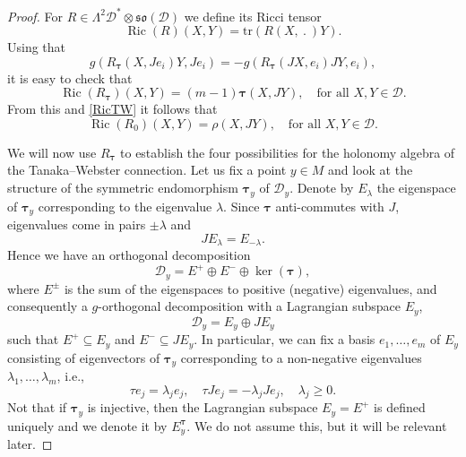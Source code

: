 \documentclass{amsart}
\theoremstyle{plain}
\theoremstyle{definition}
\newcommand{\Ric}{\operatorname{Ric}}
\def\so{\mathfrak{so}}
\newcommand{\bt}{{\boldsymbol{\tau}}}
\newcommand{\1}{\mathbf{1}}
\newcommand{\D}{{\mathcal D}}
\newcommand{\+}{\oplus}
\newcommand{\tcom}[1]{
 \marginpar{{\scriptsize  T: #1 }}}
\begin{document}
\begin{proof}
For $R\in \Lambda^2\D^*\otimes \so(\D)$ we define its Ricci tensor
\[\Ric(R)(X,Y)=\mathrm{tr}(R(X,\ .\ )Y).\]
Using that 
\[ g(R_\bt(X,Je_i)Y,Je_i) = -g(R_\bt(JX,e_i)JY,e_i),\]
it is easy to check that
\[
\Ric(R_\bt)(X,Y)=
(m-1)\bt(X,JY),\quad \text{for all } X,Y\in\D.\]
From this and \eqref{RicTW}  it follows that
\begin{equation}
\label{RicR0}\Ric(R_0)(X,Y)=\rho(X,JY),\quad\text{for all } X,Y\in\D.\end{equation}

We will now use $R_\bt$ to establish the four possibilities for the holonomy algebra of the Tanaka--Webster connection.
Let us fix a point $y\in M$ and look at the structure of the symmetric endomorphism $\bt_y$ of $\D_y$. Denote by $E_\lambda$ the eigenspace of $\bt_y$ corresponding to the eigenvalue $\lambda$. Since $\bt$ anti-commutes with $J$, eigenvalues come in pairs $\pm\lambda$ and 
$$JE_\lambda=E_{-\lambda}.$$
Hence we have an orthogonal decomposition 
\[\D_y=E^+\+E^-\+\ker(\bt),\]
where $E^\pm$ is the sum of the eigenspaces to positive (negative) eigenvalues, and consequently a $g$-orthogonal decomposition with a Lagrangian subspace $E_y$,
$$\D_y=E_y\oplus JE_y$$ such that 
$E^+\subseteq E_y$ and $E^-\subseteq JE_y$.
In particular, we can fix a basis $e_1,\dots,e_m$ of $E_y$ consisting of eigenvectors of $\bt_y$ corresponding to a non-negative eigenvalues $\lambda_1, \ldots, \lambda_m$, i.e.,
\begin{equation}\label{eigenbasis}
\tau e_j=\lambda_j e_j,\quad \tau Je_j=-\lambda_j Je_j,\quad  \lambda_j\geq 0.\end{equation}
Not that if  $\bt_y$ is injective, then the Lagrangian subspace  $E_y=E^+$ is defined uniquely and we denote it by $E^{\bt}_y$. We do not assume this, but it will be relevant later.


\end{proof}
\end{document}
